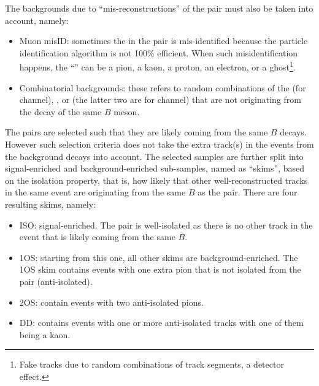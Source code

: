 The backgrounds due to ``mis-reconstructions'' of the \DXmu pair must
also be taken into account, namely:
\begin{itemize}
    \item Muon misID:
        sometimes the \muon in the \DXmu pair is mis-identified
        because the particle identification algorithm is not 100\% efficient.
        When such misidentification happens,
        the ``\muon'' can be a pion, a kaon, a proton, an electron,
        or a ghost\footnote{
            Fake tracks due to random combinations of track segments, a detector
            effect.
        }.
    \item Combinatorial backgrounds:
        these refers to random combinations of the \Dz \muon (for \Dz channel),
        \Dstar \muon, or \Dz \pion (the latter two are for \Dstar channel)
        that are not originating from the decay of the same $B$ meson.
\end{itemize}


The \DXmu pairs are selected such that they are likely coming from
the same $B$ decays.
However such selection criteria does not take the extra track(s) in the events
from the background decays into account.
The selected \DXmu samples are further split into signal-enriched and
background-enriched sub-samples, named as ``skims'',
based on the isolation property,
that is, how likely that other well-reconstructed tracks in the same event
are originating from the same $B$ as the \DXmu pair.
There are four resulting skims, namely:
\begin{itemize}
    \item ISO: signal-enriched. The \DXmu pair is well-isolated as there
        is no other track in the event that is likely coming from the same $B$.
    \item 1OS: starting from this one, all other skims are background-enriched.
        The 1OS skim contains events with one extra pion that is not isolated
        from the \DXmu pair
        (anti-isolated).
    \item 2OS: contain events with two anti-isolated pions.
    \item DD: contains events with one or more anti-isolated tracks with one
        of them being a kaon.
\end{itemize}



